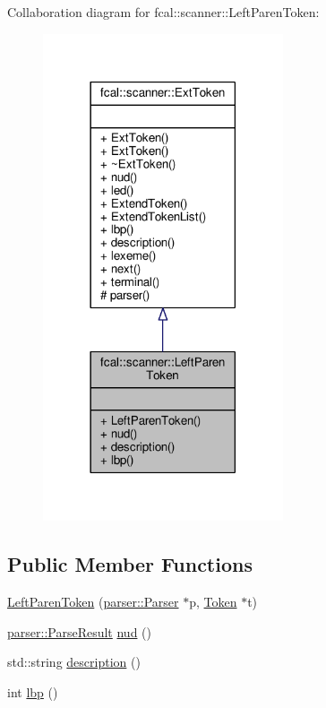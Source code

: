 Collaboration diagram for fcal\+:\+:scanner\+:\+:Left\+Paren\+Token\+:
\nopagebreak
\begin{figure}[H]
\begin{center}
\leavevmode
\includegraphics[width=201pt]{classfcal_1_1scanner_1_1LeftParenToken__coll__graph}
\end{center}
\end{figure}
\subsection*{Public Member Functions}
\begin{DoxyCompactItemize}
\item 
\hyperlink{classfcal_1_1scanner_1_1LeftParenToken_a306e81a052bdff9c4e9fb4912e0732ee}{Left\+Paren\+Token} (\hyperlink{classfcal_1_1parser_1_1Parser}{parser\+::\+Parser} $\ast$p, \hyperlink{classfcal_1_1scanner_1_1Token}{Token} $\ast$t)
\item 
\hyperlink{classfcal_1_1parser_1_1ParseResult}{parser\+::\+Parse\+Result} \hyperlink{classfcal_1_1scanner_1_1LeftParenToken_a793eb1dfcd6ea5546081c7cf8733534a}{nud} ()
\item 
std\+::string \hyperlink{classfcal_1_1scanner_1_1LeftParenToken_a32ea8cf7b793bb532161781f8f42113c}{description} ()
\item 
int \hyperlink{classfcal_1_1scanner_1_1LeftParenToken_a2bfc3c31dc0fef8961d4f33a3bc81f25}{lbp} ()
\end{DoxyCompactItemize}
